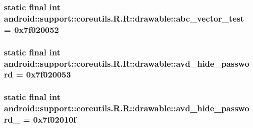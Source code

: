 \hypertarget{classandroid_1_1support_1_1coreutils_1_1_r_1_1drawable_13a6ee0084ba09243eae6f6b979c92ce}{
\subsubsection[{abc\_\-vector\_\-test}]{\setlength{\rightskip}{0pt plus 5cm}static final int android::support::coreutils.R.R::drawable::abc\_\-vector\_\-test = 0x7f020052}}
\label{classandroid_1_1support_1_1coreutils_1_1_r_1_1drawable_13a6ee0084ba09243eae6f6b979c92ce}


\hypertarget{classandroid_1_1support_1_1coreutils_1_1_r_1_1drawable_d0da37f7ffaa81107278f802ef0d5b9d}{
\subsubsection[{avd\_\-hide\_\-password}]{\setlength{\rightskip}{0pt plus 5cm}static final int android::support::coreutils.R.R::drawable::avd\_\-hide\_\-password = 0x7f020053}}
\label{classandroid_1_1support_1_1coreutils_1_1_r_1_1drawable_d0da37f7ffaa81107278f802ef0d5b9d}


\hypertarget{classandroid_1_1support_1_1coreutils_1_1_r_1_1drawable_2d058f1acff2482648d1ff05db2b2dc9}{
\subsubsection[{avd\_\-hide\_\-password\_\-1}]{\setlength{\rightskip}{0pt plus 5cm}static final int android::support::coreutils.R.R::drawable::avd\_\-hide\_\-password\_ = 0x7f02010f}}
\label{classandroid_1_1support_1_1coreutils_1_1_r_1_1drawable_2d058f1acff2482648d1ff05db2b2dc9}


